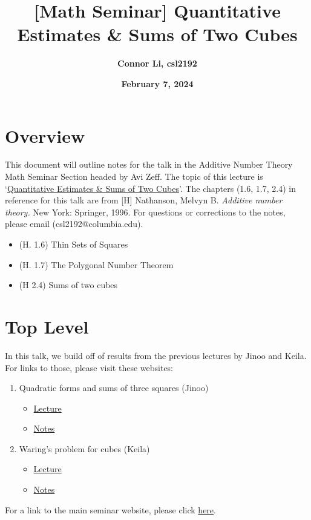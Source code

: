 \documentclass[8pt]{extarticle}
\title{\textbf{[Math Seminar] Quantitative Estimates \& Sums of Two Cubes}}
\author{\textbf{Connor Li, csl2192}}
\date{\textbf{February 7, 2024}}
\begin{document}
\maketitle

\tableofcontents


\pagebreak
\section{Overview}
This document will outline notes for the talk in the Additive Number Theory Math Seminar Section headed by Avi Zeff. The topic of this lecture is `\underline{Quantitative Estimates \& Sums of Two Cubes}'. The chapters (1.6, 1.7, 2.4) in reference for this talk are from [H] Nathanson, Melvyn B. \textit{Additive number theory.} New York: Springer, 1996. For questions or corrections to the notes, please email (csl2192@columbia.edu).
\begin{itemize}
    \item (H. 1.6) Thin Sets of Squares
    \item (H. 1.7) The Polygonal Number Theorem
    \item (H 2.4) Sums of two cubes
\end{itemize}
\section{Top Level}
In this talk, we build off of results from the previous lectures by Jinoo and Keila. For links to those, please visit these websites:
\begin{enumerate}
    \item Quadratic forms and sums of three squares	(Jinoo)
    \begin{itemize}
        \item \href{https://www.math.columbia.edu/~avizeff/additive/slides_1.pdf}{Lecture}
        \item \href{https://www.math.columbia.edu/~avizeff/additive/talk_1.pdf}{Notes}
    \end{itemize}
    \item Waring's problem for cubes (Keila)
    \begin{itemize}
        \item \href{https://columbiauniversity.zoom.us/rec/play/gU4lN9UJrLJeZoBgZbAqbsK44wzYHKJNZtP6k3ErolHShs-1IQnFnA-OMJTGxuriCBgKegFg94M-WV6x.HRxLAP5iqhDf8auU?canPlayFromShare=true&from=my_recording&continueMode=true&componentName=rec-play&originRequestUrl=https%3A%2F%2Fcolumbiauniversity.zoom.us%2Frec%2Fshare%2FlpBYukN1XkIGsG9WVN0u7t5TRrISo5aLPDYSWg-lDxi2wqzO97vefWqWSpI46wRf.Qhmaw7AjQ9XESgOo}{Lecture}
        \item \href{https://www.math.columbia.edu/~avizeff/additive/talk_2.pdf}{Notes}
    \end{itemize}
\end{enumerate}
For a link to the main seminar website, please click \href{https://www.math.columbia.edu/~avizeff/additive/index.html}{here}.
\end{document}
